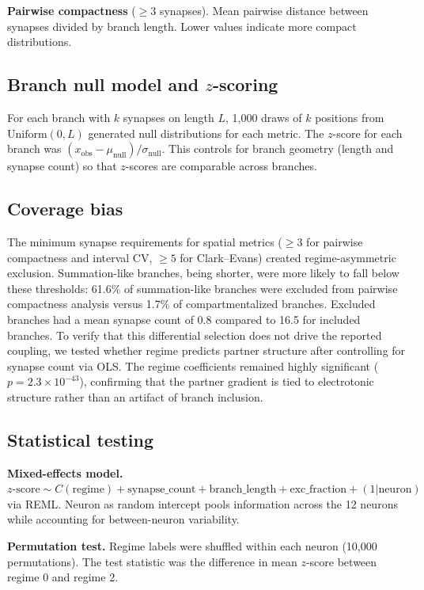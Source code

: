 \documentclass[11pt]{article}
\begin{document}
\textbf{Pairwise compactness} ($\geq 3$ synapses). Mean pairwise distance between synapses divided by branch length. Lower values indicate more compact distributions.

\subsection{Branch null model and $z$-scoring}

For each branch with $k$ synapses on length $L$, 1,000 draws of $k$ positions from $\text{Uniform}(0, L)$ generated null distributions for each metric. The $z$-score for each branch was $(x_\text{obs} - \mu_\text{null}) / \sigma_\text{null}$. This controls for branch geometry (length and synapse count) so that $z$-scores are comparable across branches.

\subsection{Coverage bias}

The minimum synapse requirements for spatial metrics ($\geq 3$ for pairwise compactness and interval CV, $\geq 5$ for Clark--Evans) created regime-asymmetric exclusion. Summation-like branches, being shorter, were more likely to fall below these thresholds: 61.6\% of summation-like branches were excluded from pairwise compactness analysis versus 1.7\% of compartmentalized branches. Excluded branches had a mean synapse count of 0.8 compared to 16.5 for included branches. To verify that this differential selection does not drive the reported coupling, we tested whether regime predicts partner structure after controlling for synapse count via OLS. The regime coefficients remained highly significant ($p = 2.3 \times 10^{-43}$), confirming that the partner gradient is tied to electrotonic structure rather than an artifact of branch inclusion.

\subsection{Statistical testing}

\textbf{Mixed-effects model.} $z\text{-score} \sim C(\text{regime}) + \text{synapse\_count} + \text{branch\_length} + \text{exc\_fraction} + (1|\text{neuron})$ via REML. Neuron as random intercept pools information across the 12 neurons while accounting for between-neuron variability.

\textbf{Permutation test.} Regime labels were shuffled within each neuron (10,000 permutations). The test statistic was the difference in mean $z$-score between regime 0 and regime 2.
\end{document}
